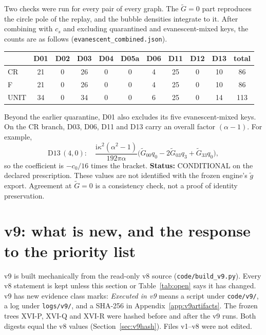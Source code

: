 \documentclass[11pt,a4paper]{article}
\newcommand{\ii}{\mathrm i}
\newcommand{\ka}{\kappa}
\newcommand{\loc}[1]{\nolinkurl{#1}}
\newcommand{\CONDITIONAL}{\textsf{CONDITIONAL}}
\theoremstyle{plain}
\theoremstyle{definition}
\theoremstyle{remark}
\numberwithin{equation}{section}
\begin{document}
Two checks were run for every pair of every graph. The
\(\tilde G=0\) part reproduces the circle pole of the replay, and
the bubble densities integrate to it.
After combining with \(c_s\) and excluding quarantined and
evanescent-mixed keys, the counts are as follows
(\loc{evanescent_combined.json}).
\begin{center}
\small
\begin{tabular}{@{}lccccccccc|c@{}}
\toprule
 & D01 & D02 & D03 & D04 & D05a & D06 & D11 & D12 & D13 & total\\
\midrule
CR & 21 & 0 & 26 & 0 & 0 & 4 & 25 & 0 & 10 & 86\\
F & 21 & 0 & 26 & 0 & 0 & 4 & 25 & 0 & 10 & 86\\
UNIT & 34 & 0 & 34 & 0 & 0 & 6 & 25 & 0 & 14 & 113\\
\bottomrule
\end{tabular}
\end{center}
Beyond the earlier quarantine, D01 also excludes its five
evanescent-mixed keys. On the CR branch, D03, D06, D11 and D13
carry an overall factor \((\alpha-1)\). For example,
\[
 \text{D13}\,(4,0):\quad
 \frac{\ii\ka^2(\alpha^2-1)}{192\pi\alpha}
 \bigl(\tilde G_{00}q_0-2\tilde G_{03}q_3+\tilde G_{33}q_0\bigr),
\]
so the coefficient is \(-c_0/16\) times the bracket.
\textbf{Status:} \CONDITIONAL{} on the declared prescription. These
values are not identified with the frozen engine's \(\tilde g\)
export. Agreement at \(\tilde G=0\) is a consistency check, not a
proof of identity preservation.


\section{v9: what is new, and the response to the priority list}
\label{sec:whatv9}

v9 is built mechanically from the read-only v8 source
(\loc{code/build_v9.py}). Every v8 statement is kept unless this
section or Table~\ref{tab:open} says it has changed. v9 has new
evidence class marks: \emph{Executed in v9} means a script under
\loc{code/v9/}, a log under \loc{logs/v9/}, and a SHA-256 in
Appendix~\ref{app:v9artifacts}. The frozen trees XVI-P, XVI-Q and
XVI-R were hashed before and after the v9 runs. Both digests equal
the v8 values (Section~\ref{sec:v9hash}). Files v1--v8 were not
edited.
\end{document}
